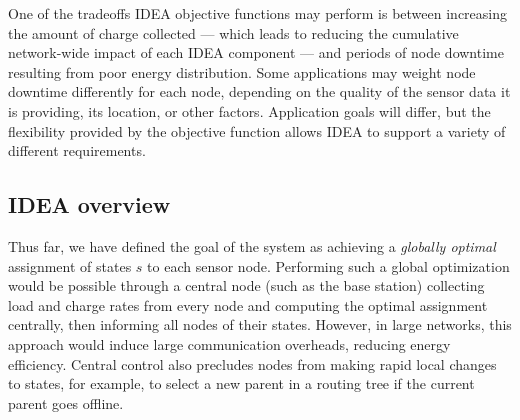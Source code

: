 One of the tradeoffs IDEA objective functions may perform is between
increasing the amount of charge collected --- which leads to reducing the
cumulative network-wide impact of each IDEA component --- and periods of node
downtime resulting from poor energy distribution.  Some applications may
weight node downtime differently for each node, depending on the quality of
the sensor data it is providing, its location, or other factors. Application
goals will differ, but the flexibility provided by the objective function
allows IDEA to support a variety of different requirements.



\subsection{IDEA overview}

Thus far, we have defined the goal of the system as achieving a {\em globally
optimal} assignment of states $s$ to each sensor node.  Performing such a
global optimization would be possible through a central node (such as the
base station) collecting load and charge rates from every node and computing
the optimal assignment centrally, then informing all nodes of their states.
However, in large networks, this approach would induce large communication
overheads, reducing energy efficiency. Central control also precludes nodes
from making rapid local changes to states, for example, to select a new
parent in a routing tree if the current parent goes offline.


